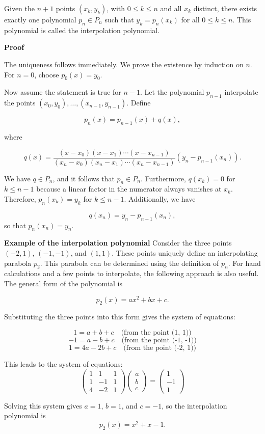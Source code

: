Given the \(n+1\) points \((x_k, y_k)\), with \(0 \leq k \leq n\) and all \(x_k\) distinct, 
there exists exactly one polynomial \(p_n \in P_n\) such that \(y_k = p_n(x_k)\) for all \(0 \leq k \leq n\). 
This polynomial is called the interpolation polynomial.
\vspace{\baselineskip}

\textbf{Proof}

The uniqueness follows immediately. We prove the existence by induction on 
\(n\). For \(n = 0\), choose \(p_0(x) = y_0\). 
\vspace{\baselineskip}

Now assume the statement is true for \(n-1\). Let the polynomial \(p_{n-1}\) 
interpolate the points \((x_0, y_0), \ldots, (x_{n-1}, y_{n-1})\). Define

\[
p_n(x) = p_{n-1}(x) + q(x),
\]

where

\[
q(x) = \frac{(x - x_0)(x - x_1)\cdots(x - x_{n-1})}{(x_n - x_0)(x_n - x_1)\cdots(x_n - x_{n-1})} (y_n - p_{n-1}(x_n)).
\]

We have \(q \in P_n\), and it follows that \(p_n \in P_n\). 
Furthermore, \(q(x_k) = 0\) for \(k \leq n-1\) because a linear factor in 
the numerator always vanishes at \(x_k\). Therefore, \(p_n(x_k) = y_k\) for 
\(k \leq n-1\). Additionally, we have

\[
q(x_n) = y_n - p_{n-1}(x_n),
\]
so that \(p_n(x_n) = y_n\). 

\QED
\vspace{\baselineskip}

\textbf{Example of the interpolation polynomial}
\vspace{\baselineskip}
Consider the three points \((-2, 1)\), \((-1, -1)\), and \((1, 1)\). 
These points uniquely define an interpolating parabola \(p_2\). This parabola can be 
determined using the definition of \(p_n\). 
For hand calculations and a few 
points to interpolate, the following approach is also useful. The general form of the polynomial is 

\[
p_2(x) = ax^2 + bx + c.
\]

Substituting the three points into this form gives the system of equations:

\[
1 = a + b + c \quad \text{(from the point (1, 1))}
\]
\[
-1 = a - b + c \quad \text{(from the point (-1, -1))}
\]
\[
1 = 4a - 2b + c \quad \text{(from the point (-2, 1))}
\]

This leads to the system of equations:
\[
\begin{pmatrix}
1 & 1 & 1 \\
1 & -1 & 1 \\
4 & -2 & 1
\end{pmatrix}
\begin{pmatrix}
a \\
b \\
c
\end{pmatrix}
=
\begin{pmatrix}
1 \\
-1 \\
1
\end{pmatrix}
\]

Solving this system gives \(a = 1\), \(b = 1\), and \(c = -1\), so the interpolation polynomial is
\[
p_2(x) = x^2 + x - 1.
\]


